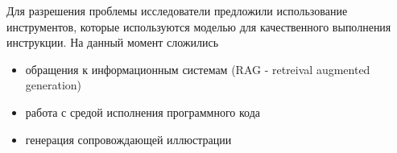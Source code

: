 Для разрешения проблемы исследователи предложили использование инструментов,
которые используются моделью для качественного выполнения инструкции. На данный момент сложились \begin{itemize}
    \item обращения к информационным системам  (RAG - retreival augmented generation)\cite{lewis2020retrieval}
    \item работа с средой исполнения программного кода \cite{parisi2022talm}
    \item генерация сопровождающей иллюстрации \cite{rombach2022high}
\end{itemize}










